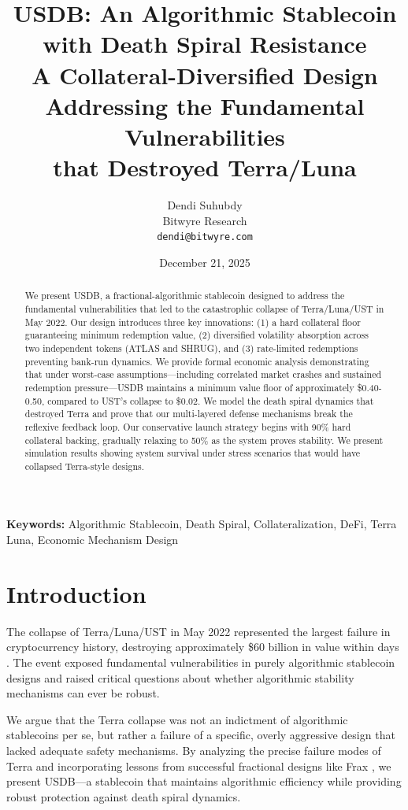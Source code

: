 \documentclass[11pt,a4paper]{article}
\title{\textbf{USDB: An Algorithmic Stablecoin with Death Spiral Resistance}\\[0.5em]
\large A Collateral-Diversified Design Addressing the Fundamental Vulnerabilities\\that Destroyed Terra/Luna}
\author{Dendi Suhubdy\\
Bitwyre Research\\
\texttt{dendi@bitwyre.com}}
\date{December 21, 2025}
\begin{document}
\maketitle

\begin{abstract}
We present USDB, a fractional-algorithmic stablecoin designed to address the fundamental vulnerabilities that led to the catastrophic collapse of Terra/Luna/UST in May 2022. Our design introduces three key innovations: (1) a hard collateral floor guaranteeing minimum redemption value, (2) diversified volatility absorption across two independent tokens (ATLAS and SHRUG), and (3) rate-limited redemptions preventing bank-run dynamics. We provide formal economic analysis demonstrating that under worst-case assumptions---including correlated market crashes and sustained redemption pressure---USDB maintains a minimum value floor of approximately \$0.40-0.50, compared to UST's collapse to \$0.02. We model the death spiral dynamics that destroyed Terra and prove that our multi-layered defense mechanisms break the reflexive feedback loop. Our conservative launch strategy begins with 90\% hard collateral backing, gradually relaxing to 50\% as the system proves stability. We present simulation results showing system survival under stress scenarios that would have collapsed Terra-style designs.
\end{abstract}

\noindent\textbf{Keywords:} Algorithmic Stablecoin, Death Spiral, Collateralization, DeFi, Terra Luna, Economic Mechanism Design

\tableofcontents
\newpage

\section{Introduction}

The collapse of Terra/Luna/UST in May 2022 represented the largest failure in cryptocurrency history, destroying approximately \$60 billion in value within days \cite{Liu2023}. The event exposed fundamental vulnerabilities in purely algorithmic stablecoin designs and raised critical questions about whether algorithmic stability mechanisms can ever be robust.

We argue that the Terra collapse was not an indictment of algorithmic stablecoins per se, but rather a failure of a specific, overly aggressive design that lacked adequate safety mechanisms. By analyzing the precise failure modes of Terra and incorporating lessons from successful fractional designs like Frax \cite{Kazemian2020}, we present USDB---a stablecoin that maintains algorithmic efficiency while providing robust protection against death spiral dynamics.
\end{document}

